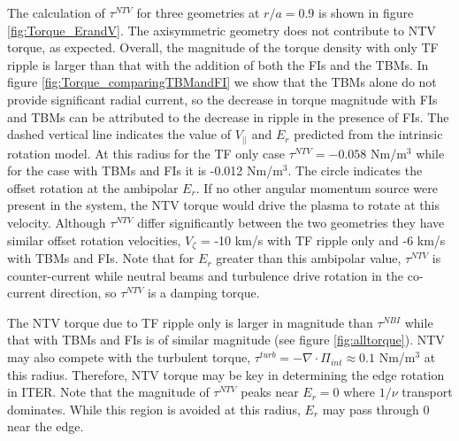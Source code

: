 \documentclass{article}
\numberwithin{figure}{section}
\numberwithin{equation}{section}
\begin{document}
The calculation of $\tau^{NTV}$ for three geometries at $r/a = 0.9$ is shown in figure \ref{fig:Torque_ErandV}. The axisymmetric geometry does not contribute to NTV torque, as expected. Overall, the magnitude of the torque density with only TF ripple is larger than that with the addition of both the FIs and the TBMs.  In figure \ref{fig:Torque_comparingTBMandFI} we show that the TBMs alone do not provide significant radial current, so the decrease in torque magnitude with FIs and TBMs can be attributed to the decrease in ripple in the presence of FIs. The dashed vertical line indicates the value of $V_{||}$ and $E_r$ predicted from the intrinsic rotation model. At this radius for the TF only case $\tau^{NTV} = -0.058$ Nm/m$^3$ while for the case with TBMs and FIs it is -0.012 Nm/m$^3$. The circle indicates the offset rotation at the ambipolar $E_r$. If no other angular momentum source were present in the system, the NTV torque would drive the plasma to rotate at this velocity. Although $\tau^{NTV}$ differ significantly between the two geometries they have similar offset rotation velocities, $V_{\zeta}$ = -10 km/s with TF ripple only and -6 km/s with TBMs and FIs. Note that for $E_r$ greater than this ambipolar value, $\tau^{NTV}$ is counter-current while neutral beams and turbulence drive rotation in the co-current direction, so $\tau^{NTV}$ is a damping torque. 

The NTV torque due to TF ripple only is larger in magnitude than $\tau^{NBI}$ while that with TBMs and FIs is of similar magnitude (see figure \ref{fig:alltorque}). NTV may also compete with the turbulent torque, $\tau^{turb} = - \nabla \cdot \Pi_{int} \approx 0.1$ Nm/m$^3$ at this radius. Therefore, NTV torque may be key in determining the edge rotation in ITER. Note that the magnitude of $\tau^{NTV}$ peaks near $E_r = 0$ where $1/\nu$ transport dominates. While this region is avoided at this radius, $E_r$ may pass through 0 near the edge. 

\FloatBarrier
\end{document}
